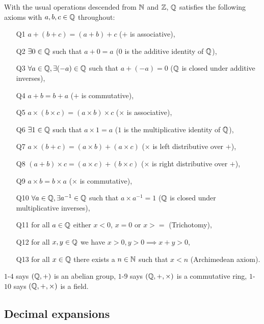 \documentclass[../Year1.tex]{subfiles}
\begin{document}
\begin{theorem}
    With the usual operations descended from $\mathbb{N}$ and $\mathbb{Z}$, $\mathbb{Q}$ satisfies the following axioms with $a,b,c\in\mathbb{Q}$ throughout: \begin{enumerate}
        \item[Q1] $a+(b+c)=(a+b)+c$ ($+$ is associative),
        \item[Q2] $\exists 0\in\mathbb{Q}$ such that $a+0=a$ ($0$ is the additive identity of $\mathbb{Q}$),
        \item[Q3] $\forall a \in \mathbb{Q}, \exists (-a)\in\mathbb{Q}$ such that $a+ (-a) = 0$ ($\mathbb{Q}$ is closed under additive inverses),
        \item[Q4] $a+b = b+a$ ($+$ is commutative),\vspace{5pt}
        \item[Q5] $a\times(b\times c)=(a\times b)\times c$ ($\times$ is associative),
        \item[Q6] $\exists 1\in\mathbb{Q}$ such that $a\times1=a$ ($1$ is the multiplicative identity of $\mathbb{Q}$),
        \item[Q7] $a\times(b+c) = (a\times b) + (a\times c)$ ($\times$ is left distributive over $+$),
        \item[Q8] $(a+b)\times c = (a\times c) + (b\times c)$ ($\times$ is right distributive over $+$),
        \item[Q9] $a\times b = b\times a$ ($\times$ is commutative),\vspace{5pt}
        \item[Q10] $\forall a \in \mathbb{Q}, \exists a^{-1}\in\mathbb{Q}$ such that $a \times a^{-1} = 1$ ($\mathbb{Q}$ is closed under multiplicative inverses),\vspace{5pt}
        \item[Q11] for all $a\in\mathbb{Q}$ either $x<0$, $x=0$ or $x>=$ (Trichotomy),
        \item[Q12] for all $x,y\in\mathbb{Q}$ we have $x>0,y>0\implies x+y>0$,
        \item[Q13] for all $x\in\mathbb{Q}$ there exists a $n\in\mathbb{N}$ such that $x<n$ (Archimedean axiom).
    \end{enumerate} $1$-$4$ says $(\mathbb{Q},+)$ is an abelian group, $1$-$9$ says $(\mathbb{Q},+,\times)$ is a commutative ring, $1$-$10$ says $(\mathbb{Q},+,\times)$ is a field.
\end{theorem}

\subsection{Decimal expansions}
\end{document}
